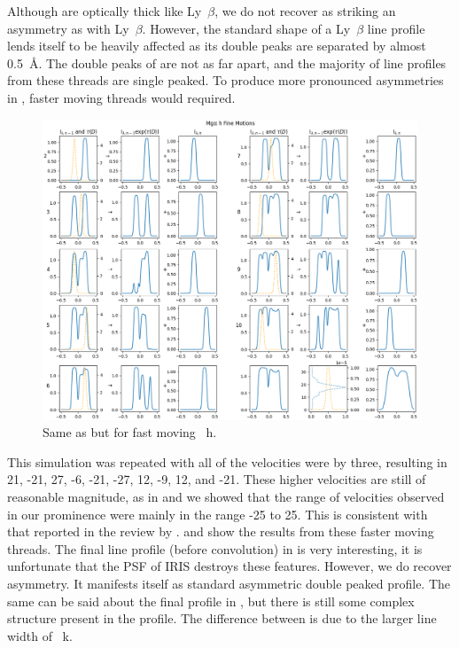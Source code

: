 Although \mgiihk{} are optically thick like Ly~$\beta$, we do not recover as striking an asymmetry as \cite{gunar_lyman-line_2008} with Ly~$\beta$. However, the standard shape of a Ly~$\beta$ line profile lends itself to be heavily affected as its double peaks are separated by almost 0.5~\AA. The double peaks of \mgiihk{} are not as far apart, and the majority of line profiles from these threads are single peaked. To produce more pronounced asymmetries in \mgiihk{}, faster moving threads would required. 
\begin{figure}
    \includegraphics[width=\linewidth]{./03Modelling2D/figs/StanoPlots/fast/h.png}
    \caption[Fast Moving \mgii~h threads.]{Same as  but for fast moving \mgii~h.}
    \label{fastmgiih}
\end{figure}
This simulation was repeated with all of the velocities were by three, resulting in 21\kms, -21\kms, 27\kms, -6\kms, -21\kms, -27\kms, 12\kms, -9\kms, 12\kms, and -21\kms. 
These higher velocities are still of reasonable magnitude, as in  and  we showed that the range of velocities observed in our prominence were mainly in the range -25\kms{} to 25\kms{}. This is consistent with that reported in the review by \cite{labrosse_physics_2010}.  and  show the results from these faster moving threads. The final line profile (before convolution) in  is very interesting, it is unfortunate that the PSF of IRIS destroys these features. However, we do recover asymmetry. It manifests itself as standard asymmetric double peaked profile.  The same can be said about the final profile in , but there is still some complex structure present in the profile. The difference between \mgiihk{} is due to the larger line width of \mgii~k. 

